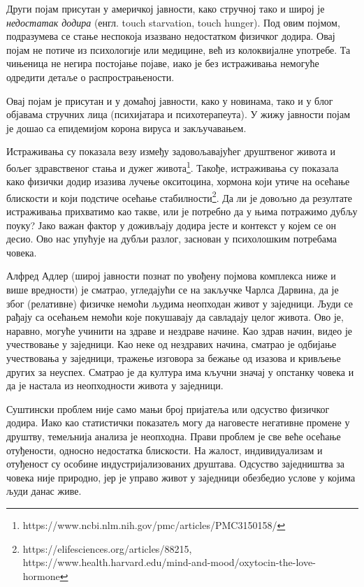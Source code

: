 \documentclass[b5paper]{article}
\begin{document}
Други појам присутан у америчкој јавности, како стручној тако и широј је \textit{недостатак додира} (енгл. touch starvation, touch hunger). Под овим појмом, подразумева се стање неспокоја изазвано недостатком физичког додира. Овај појам не потиче из психологије или медицине, већ из колоквијалне употребе. Та чињеница не негира постојање појаве, иако је без истраживања немогуће одредити детаље о распрострањености.

Овај појам је присутан и у домаћој јавности, како у новинама, тако и у блог објавама стручних лица (психијатара и психотерапеута). У жижу јавности појам је дошао са епидемијом корона вируса и закључавањем.

Истраживања су показала везу између задовољавајућег друштвеног живота и бољег здравственог стања и дужег живота\footnote{https://www.ncbi.nlm.nih.gov/pmc/articles/PMC3150158/}. Такође, истраживања су показала како физички додир изазива лучење окситоцина, хормона који утиче на осећање блискости и који подстиче осећање стабилности\footnote{https://elifesciences.org/articles/88215, https://www.health.harvard.edu/mind-and-mood/oxytocin-the-love-hormone}. Да ли је довољно да резултате истраживања прихватимо као такве, или је потребно да у њима потражимо дубљу поуку? Јако важан фактор у доживљају додира јесте и контекст у којем се он десио. Ово нас упућује на дубљи разлог, заснован у психолошким потребама човека.

Алфред Адлер (широј јавности познат по увођену појмова комплекса ниже и више вредности) је сматрао, угледајући се на закључке Чарлса Дарвина, да је због (релативне) физичке немоћи људима неопходан живот у заједници. Људи се рађају са осећањем немоћи које покушавају да савладају целог живота. Ово је, наравно, могуће учинити на здраве и нездраве начине. Као здрав начин, видео је учествовање у заједници. Као неке од нездравих начина, сматрао је одбијање учествовања у заједници, тражење изговора за бежање од изазова и кривљење других за неуспех. Сматрао је да култура има кључни значај у опстанку човека и да је настала из неопходности живота у заједници.

Суштински проблем није само мањи број пријатеља или одсуство физичког додира. Иако као статистички показатељ могу да наговесте негативне промене у друштву, темељнија анализа је неопходна. Прави проблем је све веће осећање отуђености, односно недостатка блискости. На жалост, индивидуализам и отуђеност су особине индустријализованих друштава. Одсуство заједништва за човека није природно, јер је управо живот у заједници обезбедио услове у којима људи данас живе.
\end{document}
